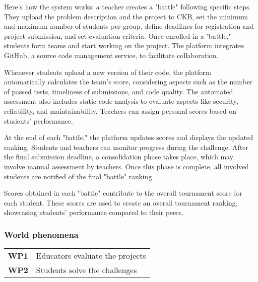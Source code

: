 \noindent Here's how the system works: a teacher creates a "battle" following specific steps. They upload the problem description and the project to CKB, set the minimum and maximum number of students per group, define deadlines for registration and project submission, and set evaluation criteria. Once enrolled in a "battle," students form teams and start working on the project. The platform integrates GitHub, a source code management service, to facilitate collaboration.

\noindent Whenever students upload a new version of their code, the platform automatically calculates the team's score, considering aspects such as the number of passed tests, timeliness of submissions, and code quality. The automated assessment also includes static code analysis to evaluate aspects like security, reliability, and maintainability. Teachers can assign personal scores based on students' performance.

\noindent At the end of each "battle," the platform updates scores and displays the updated ranking. Students and teachers can monitor progress during the challenge. After the final submission deadline, a consolidation phase takes place, which may involve manual assessment by teachers. Once this phase is complete, all involved students are notified of the final "battle" ranking.

\noindent Scores obtained in each "battle" contribute to the overall tournament score for each student. These scores are used to create an overall tournament ranking, showcasing students' performance compared to their peers.

\subsubsection{World phenomena}
\begin{table}[H]
    \begin{tabularx}{\textwidth}{cX}
        \toprule
        \textbf{WP1} & Educators evaluate the projects        \\
        \textbf{WP2} & Students solve the challenges  
        \\ \bottomrule
    \end{tabularx}
\end{table}

